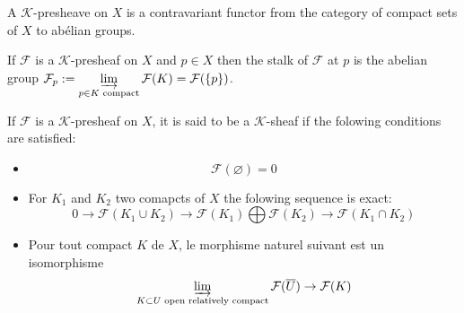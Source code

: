 \begin{definition}
    \label{def:K_pre_sheaves}
    A $\mathcal{K}$-presheave on $X$ is a contravariant functor from the category of compact sets of $X$ to abélian groups.
\end{definition}

\begin{definition}
    \label{def:K_stalk}
    If $\mathcal{F}$ is a $\mathcal{K}$-presheaf on $X$ and $p\in X$ then the stalk of $\mathcal{F}$ at $p$ is the abelian group $\mathcal{F}_p:=\varinjlim\limits_{p\in K\text{ compact}}\mathcal{F}(K)=\mathcal{F}(\{p\})$.  
\end{definition}

\begin{definition}
    \label{def:K_sheaves}
    If $\mathcal{F}$ is a $\mathcal{K}$-presheaf on $X$, it is said to be a $\mathcal{K}$-sheaf if the folowing conditions are satisfied:\begin{itemize}
    \item\begin{equation}\label{axiom:Ksh1}
        \mathcal{F}(\varnothing)=0
    \end{equation}
    \item For $K_1$ and $K_2$ two comapcts of $X$ the folowing sequence is exact:\begin{equation}\label{axiom:Ksh2}
         0\to\mathcal{F}(K_1\cup K_2)\to \mathcal{F}(K_1)\bigoplus\mathcal{F}(K_2)\to \mathcal{F}(K_1\cap K_2) 
    \end{equation}
    \item Pour tout compact $K$ de $X$, le morphisme naturel suivant est un isomorphisme \begin{equation}\label{axiom:Ksh3}
        \varinjlim\limits_{K\subset U\text{ open relatively compact}}\mathcal{F}(\overline{U})\to \mathcal{F}(K)
    \end{equation}
\end{itemize}
\end{definition}



